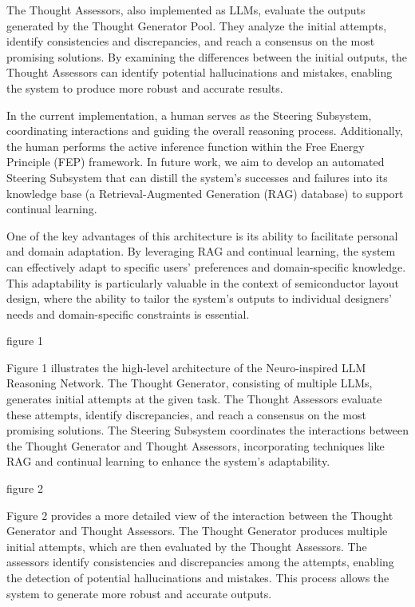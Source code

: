 \documentclass{article}
\begin{document}
The Thought Assessors, also implemented as LLMs, evaluate the outputs generated by the Thought Generator Pool. They analyze the initial attempts, identify consistencies and discrepancies, and reach a consensus on the most promising solutions. By examining the differences between the initial outputs, the Thought Assessors can identify potential hallucinations and mistakes, enabling the system to produce more robust and accurate results.

In the current implementation, a human serves as the Steering Subsystem, coordinating interactions and guiding the overall reasoning process. Additionally, the human performs the active inference function within the Free Energy Principle (FEP) framework. In future work, we aim to develop an automated Steering Subsystem that can distill the system's successes and failures into its knowledge base (a Retrieval-Augmented Generation (RAG) database) to support continual learning.

One of the key advantages of this architecture is its ability to facilitate personal and domain adaptation. By leveraging RAG and continual learning, the system can effectively adapt to specific users' preferences and domain-specific knowledge. This adaptability is particularly valuable in the context of semiconductor layout design, where the ability to tailor the system's outputs to individual designers' needs and domain-specific constraints is essential.

figure 1

Figure 1 illustrates the high-level architecture of the Neuro-inspired LLM Reasoning Network. The Thought Generator, consisting of multiple LLMs, generates initial attempts at the given task. The Thought Assessors evaluate these attempts, identify discrepancies, and reach a consensus on the most promising solutions. The Steering Subsystem coordinates the interactions between the Thought Generator and Thought Assessors, incorporating techniques like RAG and continual learning to enhance the system's adaptability.

figure 2

Figure 2 provides a more detailed view of the interaction between the Thought Generator and Thought Assessors. The Thought Generator produces multiple initial attempts, which are then evaluated by the Thought Assessors. The assessors identify consistencies and discrepancies among the attempts, enabling the detection of potential hallucinations and mistakes. This process allows the system to generate more robust and accurate outputs.
\end{document}
